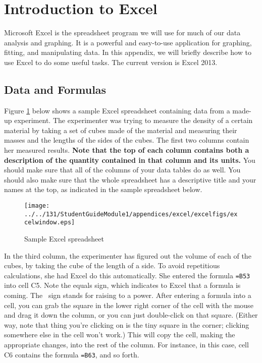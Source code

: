 
\section{Introduction to Excel}
\label{excel}

Microsoft Excel is the spreadsheet program we will use for much of our
data analysis and graphing.  It is a powerful and easy-to-use
application for graphing, fitting, and manipulating data. In this
appendix, we will briefly describe how to use Excel to do some useful
tasks.  The current version is Excel 2013.

\subsection{Data and Formulas}

Figure \ref{fig:excel} below shows a sample Excel spreadsheet containing data
from a made-up experiment.  The experimenter was trying to measure
the density of a certain material by taking a set of cubes
made of the material and measuring their masses and the lengths of
the sides of the cubes.  The first two columns contain her measured
results.  \textbf{Note that the top of each column contains both
a description of the quantity contained in that column and its units.}
You should make sure that all of the columns of your data tables do as well.
You should also make sure that the whole spreadsheet has a descriptive
title and your names at the top, as indicated in the sample spreadsheet 
below.

\begin{figure}[b!]
\centerline{\texttt{[image: ../../131/StudentGuideModule1/appendices/excel/excelfigs/excelwindow.eps]}}
\caption{Sample Excel spreadsheet}
\label{fig:excel}
\end{figure}

In the third column, the experimenter has figured out the volume
of each of the cubes, by taking the cube of the length of a side.
To avoid repetitious calculations, she had Excel do this automatically.
She entered the formula 
\verb!=B5!\specialcaret \verb!3!
into cell C5.
Note the equals sign, which indicates to Excel that a formula is coming.
The \specialcaret ~sign stands for raising to a power.  After entering a formula
into a cell, you can grab the square in the lower right corner of the
cell with the mouse and drag it down the column, or you can just double-click
on that square.  (Either way, note that thing you're clicking on is
the tiny square in the corner; clicking somewhere else in the cell won't work.)
This will copy
the cell, making the appropriate changes, into the rest of the column.
For instance, in this case, cell C6 contains the formula \verb!=B6!\specialcaret \verb!3!,
and so forth.


